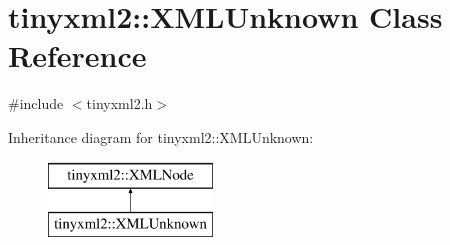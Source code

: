 \hypertarget{classtinyxml2_1_1_x_m_l_unknown}{}\section{tinyxml2\+:\+:X\+M\+L\+Unknown Class Reference}
\label{classtinyxml2_1_1_x_m_l_unknown}


{\ttfamily \#include $<$tinyxml2.\+h$>$}

Inheritance diagram for tinyxml2\+:\+:X\+M\+L\+Unknown\+:\begin{figure}[H]
\begin{center}
\leavevmode
\includegraphics[height=2.000000cm]{classtinyxml2_1_1_x_m_l_unknown}
\end{center}
\end{figure}
